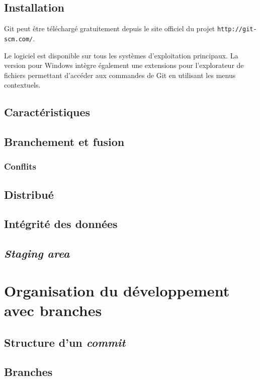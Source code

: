 \documentclass[11pt,a4paper]{article}
\begin{document}
\subsection{Installation}

Git peut être téléchargé gratuitement depuis le site officiel du projet {\tt http://git-scm.com/}.

Le logiciel est disponible sur tous les systèmes d'exploitation principaux.
La version pour Windows intègre également une extensions pour l'explorateur de fichiers permettant d'accéder aux commandes de Git en utilisant les menus contextuels.

\subsection{Caractéristiques}

\subsection{Branchement et fusion}

\subsubsection{Conflits}

\subsection{Distribué}

\subsection{Intégrité des données}

\subsection{\textit{Staging area}}

\pagebreak
\section{Organisation du développement avec branches}

\subsection{Structure d'un \textit{commit}}

\subsection{Branches}
\end{document}
